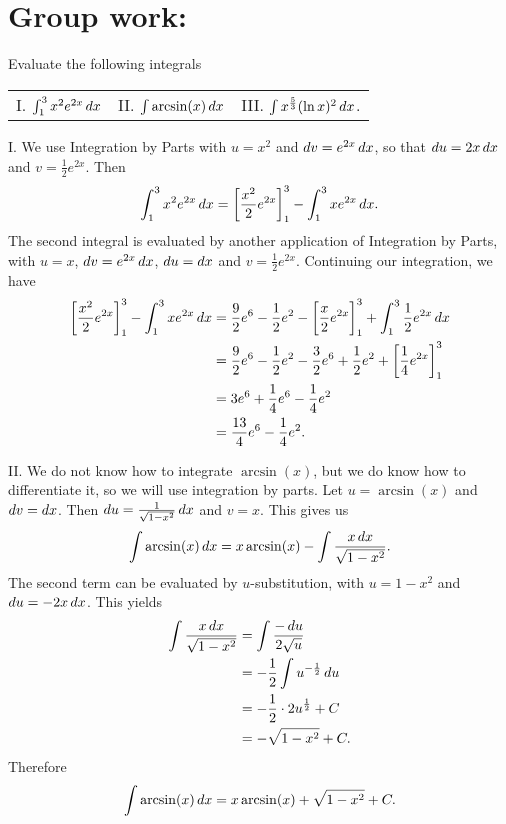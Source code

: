 \documentclass[]{ximera}
\begin{document}
\section{Group work:}


\begin{problem}
Evaluate the following integrals
\begin{center}
\begin{tabular}{lll}
I. $\int_1^3 x^2 e^{2x} \mathop{}\!d x$ \hspace{0.2in} & II. $\int \arcsin(x) \mathop{}\!d x$  \hspace{0.2in} & III. $\int x^{\frac{5}{3}} (\ln x)^2 \mathop{}\!d x$.
\end{tabular}
\end{center}
\end{problem}
	
\begin{freeResponse}
I. We use Integration by Parts with $u = x^2$ and $\mathop{}\!d v = e^{2x} \mathop{}\!d x$, so that $\mathop{}\!d u = 2x \mathop{}\!d x$ and $v = \frac{1}{2} e^{2x}$. Then
$$
\int_1^3 x^2 e^{2x} \mathop{}\!d x = \bigg[ \frac{x^2}{2} e^{2x} \bigg]_1^3 - \int_1^3 x e^{2x} \mathop{}\!d x.
$$
The second integral is evaluated by another application of Integration by Parts, with $u =x$, $\mathop{}\!d v = e^{2x} \mathop{}\!d x$, $\mathop{}\!d u = \mathop{}\!d x$ and $v = \frac{1}{2}e^{2x}$. Continuing our integration, we have 
\begin{align*}
\bigg[ \frac{x^2}{2} e^{2x} \bigg]_1^3 - \int_1^3 x e^{2x} \mathop{}\!d x & = \frac{9}{2} e^6 - \frac{1}{2} e^2 - \bigg[ \frac{x}{2}e^{2x} \bigg]_1^3 + \int_1^3 \frac{1}{2} e^{2x} \mathop{}\!d x \\
& = \frac{9}{2} e^6 - \frac{1}{2} e^2 - \frac{3}{2} e^6 + \frac{1}{2} e^2 + \bigg[ \frac{1}{4}e^{2x} \bigg]_1^3 \\
& = 3e^6 + \frac{1}{4} e^6 - \frac{1}{4} e^2 \\
& = \frac{13}{4} e^6 - \frac{1}{4} e^2.
\end{align*}

II. We do not know how to integrate $\arcsin(x)$, but we do know how to differentiate it, so we will use integration by parts. Let $u = \arcsin(x)$ and $\mathop{}\!d v =  \mathop{}\!d x$. Then $\mathop{}\!d u = \frac{1}{\sqrt{1-x^2}} \mathop{}\!d x$ and $v = x$. This gives us
$$
\int \arcsin(x) \mathop{}\!d x = x\arcsin(x) - \int \frac{x \mathop{}\!d x}{\sqrt{1-x^2}}.
$$
The second term can be evaluated by $u$-substitution, with $u = 1- x^2$ and $\mathop{}\!d u = -2x \mathop{}\!d x$.  This yields
	\begin{align*}
	\int \frac{x \mathop{}\!d x}{\sqrt{1-x^2}} &= \int \frac{-\mathop{}\!d u}{2\sqrt{u}}\\
	&= -\frac{1}{2} \int u^{-\frac{1}{2}} \mathop{}\!d u \\
	&= -\frac{1}{2} \cdot 2u^{\frac{1}{2}} +C \\
	&= - \sqrt{1-x^2} +C.
	\end{align*}
Therefore
$$
	\int \arcsin(x) \mathop{}\!d x  = x\arcsin(x) + \sqrt{1-x^2} +C.
	$$
	

\end{freeResponse}
\end{document}
